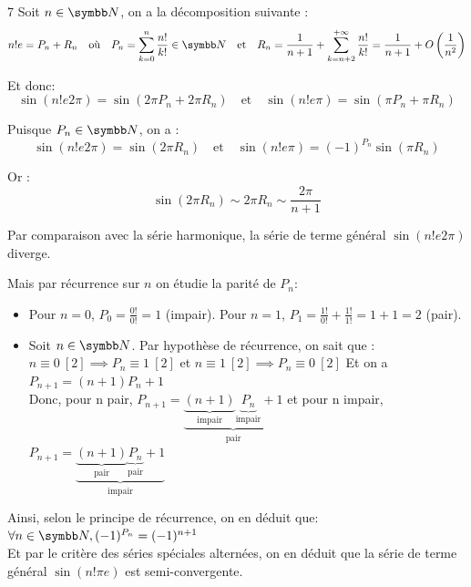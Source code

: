 \begin{correction}{7}
Soit $n \in \N$, on a la décomposition suivante :
    \[n! e = P_n + R_n  \quad \text{où} \quad P_n = \sum_{k=0}^{n} \frac{n!}{k!} \in \N \quad \text{et} \quad R_n = \frac{1}{n+1} + \sum_{k=n+2}^{+\infty} \frac{n!}{k!} = \frac{1}{n+1} + O\left(\frac{1}{n^2}\right) \] 
    
    Et donc: 
    \[ \sin(n! e 2\pi) = \sin(2\pi P_n + 2\pi R_n) \quad \text{et} \quad \sin(n! e \pi) = \sin(\pi P_n + \pi R_n) \]
    
    Puisque $P_n \in \N$, on a :
    \[ \sin(n! e 2\pi) = \sin(2\pi R_n) \quad \text{et} \quad \sin(n! e \pi) = (-1)^{P_n}\sin(\pi R_n) \]
    
    Or :
    \[\sin(2\pi R_n) \sim 2\pi R_n \sim \frac{2\pi}{n+1} \] 
    
    Par comparaison avec la série harmonique, la série de terme général $\sin(n! e 2\pi)$ diverge. \newline
    
    Mais par récurrence sur $n$ on étudie la parité de $P_n$:
    \begin{itemize}
    \item {} 
        Pour $n = 0$, $P_0 = \frac{0!}{0!} = 1$ (impair). 
        Pour $n = 1$, $P_1 = \frac{1!}{0!} + \frac{1!}{1!} = 1 + 1 = 2$ (pair).
    
    \item {} Soit $n \in \N$. Par hypothèse de récurrence, on sait que : \\
        $n \equiv 0 \ [2] \implies P_n \equiv 1 \ [2]$ \quad et \quad $n \equiv 1 \ [2] \implies P_n \equiv 0 \ [2]$ \quad Et on a \quad $P_{n+1} = (n+1)P_n + 1$ \\

        Donc, pour n pair, $P_{n+1} = \underbrace{ \underbrace{(n+1)}_{\text{impair}} \underbrace{P_n}_{\text{impair}} + 1}_{\text{pair}}$ 
        et pour n impair, $P_{n+1} = \underbrace{ \underbrace{(n+1)}_{\text{pair}} \underbrace{P_n}_{\text{pair}} + 1}_{\text{impair}}$ 
    \end{itemize}
    Ainsi, selon le principe de récurrence, on en déduit que: $\forall n \in \N, (-1)^{P_n} = (-1)^{n+1}$ \\
    
    Et par le critère des séries spéciales alternées, on en déduit que la série de terme général $\sin(n! \pi e)$ est semi-convergente.    
\end{correction}

